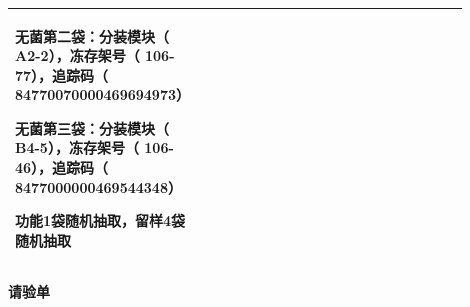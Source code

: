 \documentclass[UTF8,10pt,a4paper,fontset=fandol]{ctexart}
\newcommand{\fieldvalue}[1]{#1}
\begin{document}
\begin{tabular}{|p{0.14\linewidth}|p{0.34\linewidth}|p{0.14\linewidth}|p{0.28\linewidth}|}
{无菌第二袋：分装模块（
\fieldvalue{A2-2}），冻存架号（
\fieldvalue{106-77}），追踪码（
\fieldvalue{84770070000469694973}）

无菌第三袋：分装模块（
\fieldvalue{B4-5}），冻存架号（
\fieldvalue{106-46}），追踪码（
\fieldvalue{8477000000469544348}）

\fieldvalue{功能1袋随机抽取，留样4袋随机抽取}
}
\\ \hline
\end{tabular}

\newpage

\begin{center}
\textbf{请验单}
\end{center}
\end{document}
